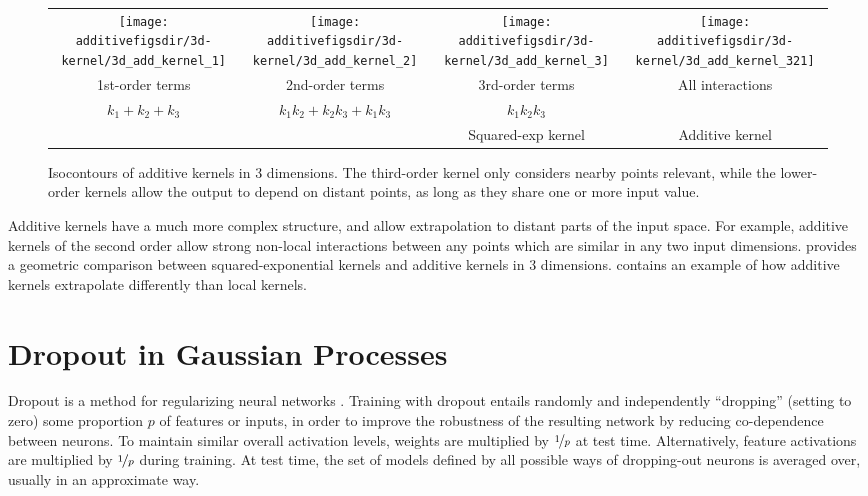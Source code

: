 \begin{figure}[ht!]
\centering
\begin{tabular}{cccc}
\hspace{-0.1in}
 \texttt{[image: \\additivefigsdir/3d-kernel/3d\_add\_kernel\_1]} &
\hspace{-0.2in} \texttt{[image: \\additivefigsdir/3d-kernel/3d\_add\_kernel\_2]} &
\hspace{-0.2in} \texttt{[image: \\additivefigsdir/3d-kernel/3d\_add\_kernel\_3]} & 
\hspace{-0.2in} \texttt{[image: \\additivefigsdir/3d-kernel/3d\_add\_kernel\_321]}\\
1st-order terms &
2nd-order terms & 
3rd-order terms & 
All interactions \\
$k_1 + k_2 + k_3$ & $k_1k_2 + k_2k_3 + k_1k_3$ & $k_1k_2k_3$ & \\
& & Squared-exp kernel & Additive kernel\\
\end{tabular}
\caption[Isocontours of additive kernels in 3 dimensions]
{Isocontours of additive kernels in 3 dimensions.
The third-order kernel only considers nearby points relevant, while the lower-order kernels allow the output to depend on distant points, as long as they share one or more input value.}
\label{fig:kernels3d}
\end{figure}

Additive kernels have a much more complex structure, and allow extrapolation to distant parts of the input space. %
For example, additive kernels of the second order allow strong non-local interactions between any points which are similar in any two input dimensions.
 provides a geometric comparison between squared-exponential kernels and additive kernels in 3 dimensions.
 contains an example of how additive kernels extrapolate differently than local kernels.





\section{Dropout in Gaussian Processes}

Dropout is a method for regularizing neural networks \citep{hinton2012improving, srivastava2013improving}.
Training with dropout entails randomly and independently ``dropping'' (setting to zero) some proportion $p$ of features or inputs, in order to improve the robustness of the resulting network by reducing co-dependence between neurons.
To maintain similar overall activation levels, weights are multiplied by $\nicefrac{1}{p}$ at test time. Alternatively, feature activations are multiplied by $\nicefrac{1}{p}$ during training.
At test time, the set of models defined by all possible ways of dropping-out neurons is averaged over, usually in an approximate way.

